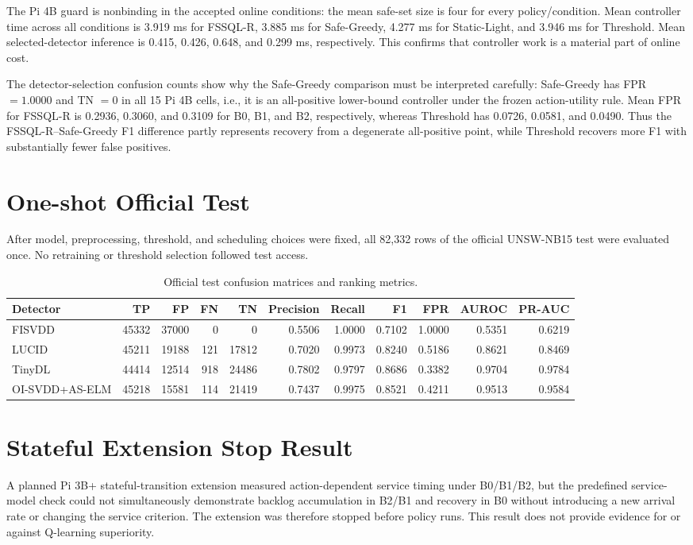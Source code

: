 \documentclass[10pt,journal]{IEEEtran}
\begin{document}
The Pi 4B guard is nonbinding in the accepted online conditions: the mean safe-set size is four for every policy/condition. Mean controller time across all conditions is 3.919 ms for FSSQL-R, 3.885 ms for Safe-Greedy, 4.277 ms for Static-Light, and 3.946 ms for Threshold. Mean selected-detector inference is 0.415, 0.426, 0.648, and 0.299 ms, respectively. This confirms that controller work is a material part of online cost.

The detector-selection confusion counts show why the Safe-Greedy comparison must be interpreted carefully: Safe-Greedy has FPR $=1.0000$ and TN $=0$ in all 15 Pi 4B cells, i.e., it is an all-positive lower-bound controller under the frozen action-utility rule. Mean FPR for FSSQL-R is 0.2936, 0.3060, and 0.3109 for B0, B1, and B2, respectively, whereas Threshold has 0.0726, 0.0581, and 0.0490. Thus the FSSQL-R--Safe-Greedy F1 difference partly represents recovery from a degenerate all-positive point, while Threshold recovers more F1 with substantially fewer false positives.

\section{One-shot Official Test}
After model, preprocessing, threshold, and scheduling choices were fixed, all 82,332 rows of the official UNSW-NB15 test were evaluated once. No retraining or threshold selection followed test access.

\begin{table}[h]
\caption{Official test confusion matrices and ranking metrics.}
\centering\footnotesize
\begin{tabular}{lrrrrrrrrrr}
\toprule
Detector & TP & FP & FN & TN & Precision & Recall & F1 & FPR & AUROC & PR-AUC \\
\midrule
FISVDD & 45332 & 37000 & 0 & 0 & 0.5506 & 1.0000 & 0.7102 & 1.0000 & 0.5351 & 0.6219 \\
LUCID & 45211 & 19188 & 121 & 17812 & 0.7020 & 0.9973 & 0.8240 & 0.5186 & 0.8621 & 0.8469 \\
TinyDL & 44414 & 12514 & 918 & 24486 & 0.7802 & 0.9797 & 0.8686 & 0.3382 & 0.9704 & 0.9784 \\
OI-SVDD+AS-ELM & 45218 & 15581 & 114 & 21419 & 0.7437 & 0.9975 & 0.8521 & 0.4211 & 0.9513 & 0.9584 \\
\bottomrule
\end{tabular}
\end{table}

\section{Stateful Extension Stop Result}
A planned Pi 3B+ stateful-transition extension measured action-dependent service timing under B0/B1/B2, but the predefined service-model check could not simultaneously demonstrate backlog accumulation in B2/B1 and recovery in B0 without introducing a new arrival rate or changing the service criterion. The extension was therefore stopped before policy runs. This result does not provide evidence for or against Q-learning superiority.
\end{document}
